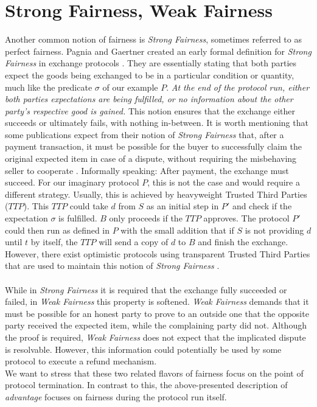 \documentclass{cacthesis}
\newcounter{protocol}
\begin{document}
        \section{Strong Fairness, Weak Fairness}
        Another common notion of fairness is \textit{Strong Fairness}, sometimes referred to as perfect fairness. Pagnia and Gaertner created an early formal definition for \textit{Strong Fairness} in exchange protocols \cite{Pagnia99onthe}. They are essentially stating that both parties expect the goods being exchanged to be in a particular condition or quantity, much like the predicate $\sigma$ of our example $P$. \textit{At the end of the protocol run, either both parties expectations are being fulfilled, or no information about the other party's respective good is gained.} This notion ensures that the exchange either succeeds or ultimately fails, with nothing in-between.
        It is worth mentioning that some publications expect from their notion of \textit{Strong Fairness} that, after a payment transaction, it must be possible for the buyer to successfully claim the original expected item in case of a dispute, without requiring the misbehaving seller to cooperate \cite{10.1007/3-540-36552-4_31}. Informally speaking: After payment, the exchange must succeed. For our imaginary protocol $P$, this is not the case and would require a different strategy. Usually, this is achieved by heavyweight Trusted Third Parties ($TTP$). This $TTP$ could take $d$ from $S$ as an initial step in $P'$ and check if the expectation $\sigma$ is fulfilled. $B$ only proceeds if the $TTP$ approves. The protocol $P'$ could then run as defined in $P$ with the small addition that if $S$ is not providing $d$ until $t$ by itself, the $TTP$ will send a copy of $d$ to $B$ and finish the exchange. However, there exist optimistic protocols using transparent Trusted Third Parties that are used to maintain this notion of \textit{Strong Fairness} \cite{10.1007/3-540-36552-4_31} \cite{6982058}. \\\\
        While in \textit{Strong Fairness} it is required that the exchange fully succeeded or failed, in \textit{Weak Fairness} this property is softened. 
        \textit{Weak Fairness} demands that it must be possible for an honest party to prove to an outside one that the opposite party received the expected item, while the complaining party did not. Although the proof is required, \textit{Weak Fairness} does not expect that the implicated dispute is resolvable. However, this information could potentially be used by some protocol to execute a refund mechanism. \\
        We want to stress that these two related flavors of fairness focus on the point of protocol termination. In contrast to this, the above-presented description of \textit{advantage} focuses on fairness during the protocol run itself.
        
\end{document}
